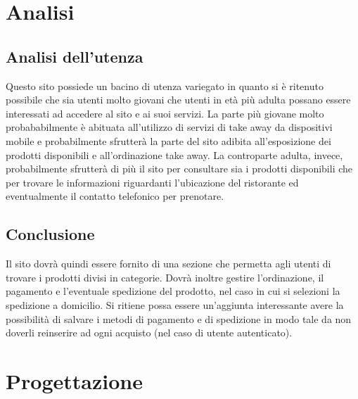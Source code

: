 \documentclass{article}
\begin{document}
	\section{Analisi}
		\subsection{Analisi dell'utenza}
			Questo sito possiede un bacino di utenza variegato in quanto si è ritenuto possibile che sia utenti molto giovani che utenti in età più adulta possano essere interessati ad accedere al sito e ai suoi servizi.
			La parte più giovane molto probababilmente è abituata all'utilizzo di servizi di take away da dispositivi mobile e probabilmente sfrutterà la parte del sito adibita all'esposizione dei prodotti disponibili e all'ordinazione take away.
			La controparte adulta, invece, probabilmente sfrutterà di più il sito per consultare sia i prodotti disponibili che per trovare le informazioni riguardanti l'ubicazione del ristorante ed eventualmente il contatto telefonico per prenotare. 
		\subsection{Conclusione}
			Il sito dovrà quindi essere fornito di una sezione che permetta agli utenti di trovare i prodotti divisi in categorie. Dovrà inoltre gestire l'ordinazione, il pagamento e l'eventuale spedizione del prodotto, nel caso in cui si selezioni la spedizione a domicilio.
			Si ritiene possa essere un'aggiunta interessante avere la possibilità di salvare i metodi di pagamento e di spedizione in modo tale da non doverli reinserire ad ogni acquisto (nel caso di utente autenticato).	
	\section{Progettazione}
\end{document}
